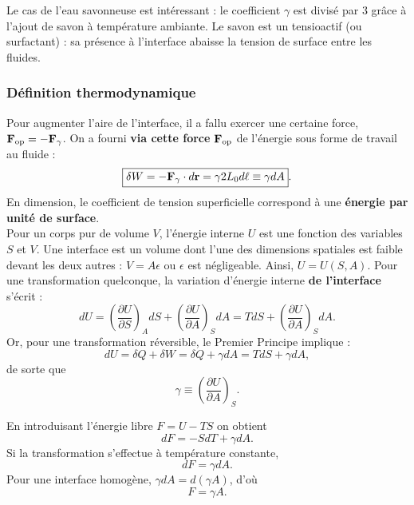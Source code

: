 \documentclass[11pt,a4paper]{report}
\begin{document}
Le cas de l'eau savonneuse est intéressant : le coefficient $\gamma$ est divisé par 3 grâce à l'ajout de savon à température ambiante. Le savon est un tensioactif (ou surfactant) : sa présence à l'interface abaisse la tension de surface entre les fluides.

	\subsubsection{Définition thermodynamique}

Pour augmenter l'aire de l'interface, il a fallu exercer une certaine force, $\bold{F}_\text{op} = - \bold{F}_\gamma$. On a fourni \textbf{via cette force} $\bold{F}_\text{op}$ de l'énergie sous forme de travail au fluide :
\begin{equation}
	\boxed{\delta W = - \bold{F}_\gamma \cdot d\bold{r} = \gamma 2 L_0 d\ell \equiv \gamma dA}.
\end{equation} 
En dimension, le coefficient de tension superficielle correspond à une \textbf{énergie par unité de surface}.\\

Pour un corps pur de volume $V$, l'énergie interne $U$ est une fonction des variables $S$ et $V$. Une interface est un volume dont l'une des dimensions spatiales est faible devant les deux autres : $V = A\epsilon$ ou $\epsilon$ est négligeable. Ainsi, $U = U(S,A)$. Pour une transformation quelconque, la variation d'énergie interne \textbf{de l'interface} s'écrit :
\begin{equation}
	dU = \left(\frac{\partial U}{\partial S}\right)_A dS + \left(\frac{\partial U}{\partial A}\right)_S dA = T dS + \left(\frac{\partial U}{\partial A}\right)_S dA.
\end{equation}
Or, pour une transformation réversible, le Premier Principe implique :
\begin{equation}
	dU = \delta Q + \delta W = \delta Q + \gamma dA = TdS + \gamma dA,
\end{equation} 
de sorte que
\begin{equation}
	\boxed{\gamma \equiv \left(\frac{\partial U}{\partial A}\right)_S}.
\end{equation}

En introduisant l'énergie libre $F = U - TS$ on obtient
\begin{equation}
	dF = -SdT + \gamma dA.
\end{equation}
Si la transformation s'effectue à température constante,
\begin{equation}
	dF = \gamma dA.
\end{equation}
Pour une interface homogène, $\gamma dA = d\left(\gamma A\right)$, d'où
\begin{equation}
	F = \gamma A.
\end{equation}
\end{document}
